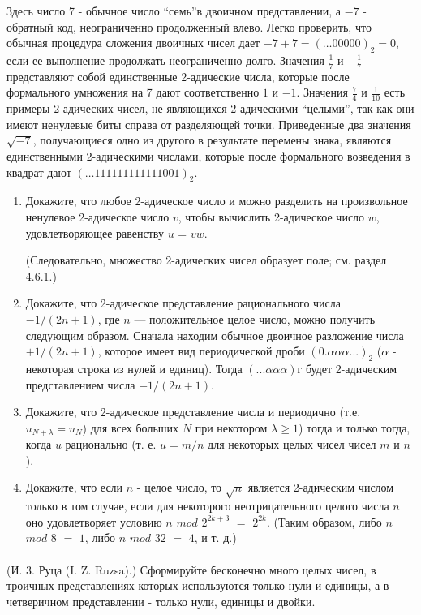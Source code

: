 Здесь число 7 - обычное число \textquotedblleft семь\textquotedblright в двоичном представлении, а $ -7$ - обратный код, неограниченно продолженный влево. Легко проверить, что обычная процедура сложения двоичных чисел дает $ -7 + 7 = ( \ldots 00000)_{2} = 0$, если ее выполнение продолжать неограниченно долго. Значения $\frac{1}{7}$ и $-\frac{1}{7}$ представляют собой единственные 2-адические числа, которые после формального умножения на 7 дают соответственно $1$ и $-1$. Значения $\frac{7}{4}$ и $\frac{1}{10}$ есть примеры 2-адических чисел, не являющихся 2-адическими \textquotedblleft целыми\textquotedblright, так как они имеют ненулевые биты справа от разделяющей точки. Приведенные два значения $\sqrt{-7}$, получающиеся одно из другого в результате перемены знака, являются единственными 2-адическими числами, которые после формального возведения в квадрат
дают $( \ldots  111111111111001)_{2}$.
\begin{enumerate}[label=\alph*)]
\item Докажите, что любое 2-адическое число и можно разделить на произвольное ненулевое 2-адическое число $v$, чтобы вычислить 2-адическое число $w$, удовлетворяющее равенству $u$ = $vw$.\tabn 

\noindent(Следовательно, множество 2-адических чисел образует поле; см. раздел 4.6.1.)
\item Докажите, что 2-адическое представление рационального числа $-1/(2n + 1)$, где $n$ — положительное целое число, можно получить следующим образом. Сначала находим обычное двоичное разложение числа $+1/(2n + 1)$, которое имеет вид периодической дроби $(0.\alpha\alpha\alpha. . .)_{2}$ ($\alpha$ - некоторая строка из нулей и единиц). Тогда $(. . .\alpha\alpha\alpha)г$ будет 2-адическим представлением числа $-1/(2n + 1)$.
\item Докажите, что 2-адическое представление числа и периодично (т.е. $u_{N + \lambda} = u_{N}$) для всех больших $N$ при некотором $\lambda \geq 1$) тогда и только тогда, когда $u$ рационально (т. е. $u = m/n$ для некоторых целых чисел чисел $m$ и $n$).
\item Докажите, что если $n$ - целое число, то $\sqrt{n}$ является 2-адическим числом только в том случае, если для некоторого неотрицательного целого числа $n$ оно удовлетворяет условию $n$ $mod$ $2^{2k + 3} $ $=$ $2^{2k}$. (Таким образом, либо $n$ $mod$ $8$ $=$ $1$, либо $n$ $mod$ $32$ $=$ $4$, и т. д.)
\end{enumerate}

\paragraph{}  (И. 3. Руца (I. Z. Ruzsa).) Сформируйте бесконечно много целых чисел, в троичных представлениях которых используются только нули и единицы, а в четверичном представлении - только нули, единицы и двойки.

